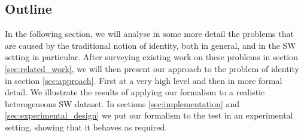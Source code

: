 \subsection{Outline}

In the following section,
  we will analyse in some more detail the problems that
  are caused by the traditional notion of identity, both in general,
  and in the SW setting in particular.
After surveying existing work on these problems
  in section \ref{sec:related_work},
  we will then present our approach to the problem of identity
  in section \ref{sec:approach}.
First at a very high level and then in more formal detail.
We illustrate the results of applying our formalism to
  a realistic heterogeneous SW dataset.
In sections \ref{sec:implementation} and \ref{sec:experimental_design}
  we put our formalism to the test
  in an experimental setting,
  showing that it behaves as required.
